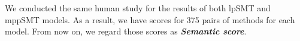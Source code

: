 


We conducted the same human study for the results of both lpSMT and
mppSMT models. As a result, we have scores for 375 pairs of methods
for each model. From now on, we regard those scores as \textbf{{\em
    Semantic score}}.



